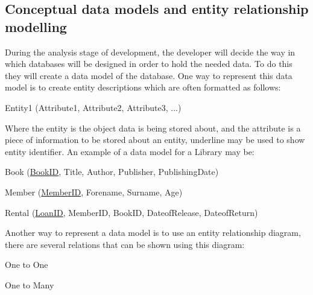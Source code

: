 \subsection{Conceptual data models and entity relationship modelling}

During the analysis stage of development, the developer will decide the way in which databases will be designed in order to hold the needed data. To do this they will create a data model of the database. One way to represent this data model is to create entity descriptions which are often formatted as follows: 

Entity1 (Attribute1, Attribute2, Attribute3, ...)

Where the entity is the object data is being stored about, and the attribute is a piece of information to be stored about an entity, underline may be used to show entity identifier. An example of a data model for a Library may be:

Book (\underline{BookID}, Title, Author, Publisher, PublishingDate)

Member (\underline{MemberID}, Forename, Surname, Age)

Rental (\underline{LoanID}, MemberID, BookID, DateofRelease, DateofReturn)

Another way to represent a data model is to use an entity relationship diagram, there are several relations that can be shown using this diagram:

One to One


One to Many



